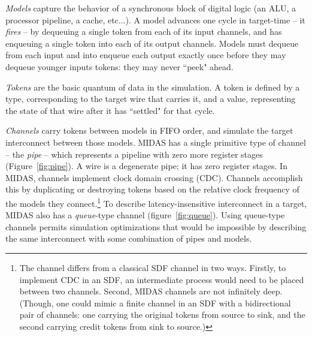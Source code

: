 \emph{Models} capture the behavior of a synchronous block of digital logic (an
ALU, a processor pipeline, a cache, etc...). A model advances one cycle in
target-time -- it \emph{fires} -- by dequeuing a single token from each of its
input channels, and has enqueuing a single token into each of its output
channels.  Models must dequeue from each input and into enqueue each output
exactly once before they may dequeue younger inputs tokens: they may never
``peek" ahead.

\emph{Tokens} are the basic quantum of data in the simulation. A token is
defined by a type, corresponding to the target wire that carries it, and a
value, representing the state of that wire after it has ``settled" for that
cycle.

\emph{Channels} carry tokens between models in FIFO order, and simulate the
target interconnect between those models. MIDAS has a single primitive type of
channel --  the \emph{pipe} -- which represents a pipeline with zero more register
stages (Figure~\ref{fig:pipe}). A wire is a degenerate pipe; it has zero register stages. In MIDAS,
channels implement clock domain crossing (CDC).  Channels accomplish this by
duplicating or destroying tokens based on the relative clock frequency of the
models they connect.\footnote{The channel differs from a classical SDF channel
in two ways.  Firstly, to implement CDC in an SDF, an intermediate process
would need to be placed between two channels. Second, MIDAS channels are not
infinitely deep.  (Though, one could mimic a finite channel in an SDF with a
bidirectional pair of channels: one carrying the original tokens from source to
sink, and the second carrying credit tokens from sink to source.)} To describe
latency-insensitive interconnect in a target, MIDAS also has a
\emph{queue}-type channel (figure~\ref{fig:queue}). Using queue-type channels permits simulation
optimizations that would be impossible by describing the same interconnect with
some combination of pipes and models.


